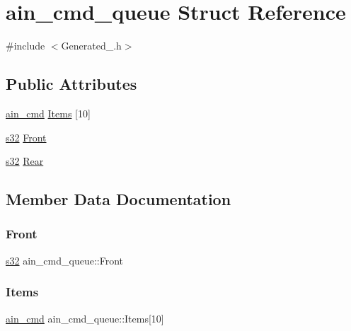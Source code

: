 \hypertarget{structain__cmd__queue}{}\section{ain\+\_\+cmd\+\_\+queue Struct Reference}
\label{structain__cmd__queue}


{\ttfamily \#include $<$Generated\+\_.\+h$>$}

\subsection*{Public Attributes}
\begin{DoxyCompactItemize}
\item 
\hyperlink{ain__machine_8h_a128a1796cd4d95a8e92ed32e492fffb2}{ain\+\_\+cmd} \hyperlink{structain__cmd__queue_a535307f8d6e4c3ecac3469995a7ada49}{Items} \mbox{[}10\mbox{]}
\item 
\hyperlink{ab__common_8h_ae9b1af5c037e57a98884758875d3a7c4}{s32} \hyperlink{structain__cmd__queue_a16dc97b8282c1e3bdfdf2577674e3832}{Front}
\item 
\hyperlink{ab__common_8h_ae9b1af5c037e57a98884758875d3a7c4}{s32} \hyperlink{structain__cmd__queue_a0b83b0068468c6fd7d08089be0bc669f}{Rear}
\end{DoxyCompactItemize}


\subsection{Member Data Documentation}
\mbox{\label{structain__cmd__queue_a16dc97b8282c1e3bdfdf2577674e3832}} 
\subsubsection{\texorpdfstring{Front}{Front}}
{\footnotesize\ttfamily \hyperlink{ab__common_8h_ae9b1af5c037e57a98884758875d3a7c4}{s32} ain\+\_\+cmd\+\_\+queue\+::\+Front}

\mbox{\label{structain__cmd__queue_a535307f8d6e4c3ecac3469995a7ada49}} 
\subsubsection{\texorpdfstring{Items}{Items}}
{\footnotesize\ttfamily \hyperlink{ain__machine_8h_a128a1796cd4d95a8e92ed32e492fffb2}{ain\+\_\+cmd} ain\+\_\+cmd\+\_\+queue\+::\+Items\mbox{[}10\mbox{]}}

